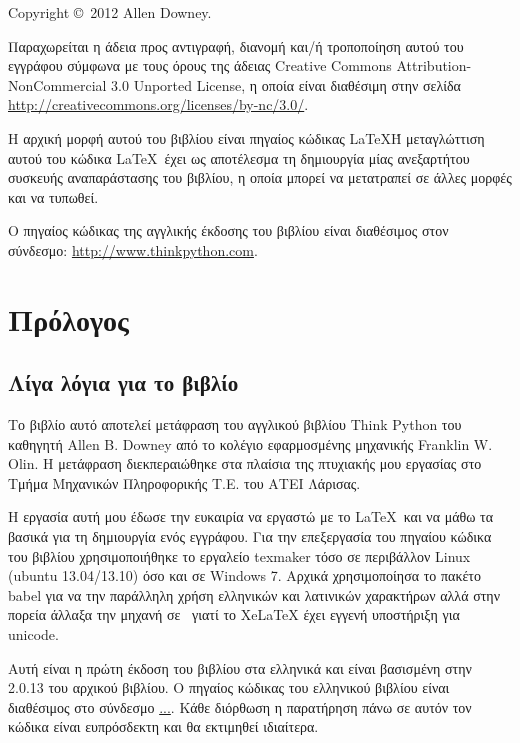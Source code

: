 \documentclass[10pt]{book}
\begin{document}
\pagebreak
\thispagestyle{empty}

{\small
Copyright \copyright ~2012 Allen Downey.


\vspace{0.2in}


Παραχωρείται η άδεια προς αντιγραφή, διανομή και/ή τροποποίηση αυτού του εγγράφου σύμφωνα με τους όρους 
της άδειας Creative Commons Attribution-NonCommercial 3.0 Unported License, η οποία είναι διαθέσιμη στην  σελίδα \url{http://creativecommons.org/licenses/by-nc/3.0/}.

Η αρχική μορφή αυτού του βιβλίου είναι πηγαίος κώδικας \LaTeX\. Η μεταγλώττιση αυτού του κώδικα \LaTeX\ 
έχει ως αποτέλεσμα τη δημιουργία μίας ανεξαρτήτου συσκευής αναπαράστασης του βιβλίου, η οποία μπορεί να μετατραπεί σε άλλες μορφές και να τυπωθεί.

Ο πηγαίος κώδικας της αγγλικής έκδοσης του βιβλίου είναι διαθέσιμος στον 
σύνδεσμο: \url{http://www.thinkpython.com}.

\vspace{0.2in}

} %

\chapter{Πρόλογος}

\section*{Λίγα λόγια για το βιβλίο}

Το βιβλίο αυτό αποτελεί μετάφραση του αγγλικού βιβλίου Think Python του καθηγητή Allen B. Downey 
από το κολέγιο εφαρμοσμένης μηχανικής Franklin W. Olin. Η μετάφραση διεκπεραιώθηκε στα πλαίσια της πτυχιακής μου εργασίας στο Τμήμα Μηχανικών Πληροφορικής Τ.Ε. του ΑΤΕΙ Λάρισας. 

Η εργασία αυτή μου έδωσε την ευκαιρία να εργαστώ με το \LaTeX\ και να μάθω τα βασικά για τη δημιουργία ενός εγγράφου. Για την επεξεργασία του πηγαίου κώδικα του βιβλίου χρησιμοποιήθηκε το εργαλείο texmaker τόσο σε περιβάλλον Linux (ubuntu 13.04/13.10) όσο και σε Windows 7. Αρχικά χρησιμοποίησα το πακέτο babel για να την παράλληλη χρήση ελληνικών και λατινικών χαρακτήρων αλλά στην πορεία άλλαξα την μηχανή σε \XeTeX\ γιατί το XeLaTeX έχει εγγενή υποστήριξη για unicode. 

Αυτή είναι η πρώτη έκδοση του βιβλίου στα ελληνικά και είναι βασισμένη στην 2.0.13 του αρχικού βιβλίου. 
Ο πηγαίος κώδικας του ελληνικού βιβλίου είναι διαθέσιμος στο σύνδεσμο \url{...}. Κάθε διόρθωση η παρατήρηση πάνω σε αυτόν τον κώδικα είναι ευπρόσδεκτη και θα εκτιμηθεί ιδιαίτερα.
\end{document}
